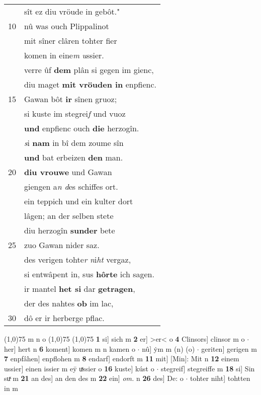 \documentclass[8pt,a4paper,notitlepage]{article}
\begin{document}
\begin{table}[ht]
\begin{minipage}[t]{0.5\linewidth}
\begin{tabular}{rl}
 & sît ez diu vröude in gebôt."\\ 
10 & nû was ouch Plippalinot\\ 
 & mit sîner clâren tohter fier\\ 
 & komen in eine\textit{m} \textit{u}ssier.\\ 
 & verre ûf \textbf{dem} plân si gegen im gienc,\\ 
 & diu maget \textbf{mit vröuden in} enpfienc.\\ 
15 & Gawan bôt \textbf{ir} sînen gruoz;\\ 
 & si kuste im stegrei\textit{f} und vuoz\\ 
 & \textbf{und} enpfienc ouch \textbf{die} herzogîn.\\ 
 & \textit{s}i \textbf{nam} in bî dem zoume sîn\\ 
 & \textbf{und} bat erbeizen \textbf{den} man.\\ 
20 & \textbf{diu vrouwe} und Gawan\\ 
 & giengen a\textit{n d}es schiffes ort.\\ 
 & ein teppich und ein kulter dort\\ 
 & lâgen; an der selben stete\\ 
 & diu herzogîn \textbf{sunder} bete\\ 
25 & zuo Gawan nider saz.\\ 
 & des verigen tohte\textit{r} \textit{n}i\textit{ht} vergaz,\\ 
 & si entwâpent in, sus \textbf{hôrte} ich sagen.\\ 
 & ir mantel \textbf{het si} dar \textbf{getragen},\\ 
 & der des nahtes \textbf{ob} im lac,\\ 
30 & dô er ir herberge pflac.\\ 
\end{tabular}
\scriptsize
\line(1,0){75} \newline
m n o \newline
\line(1,0){75} \newline
\newline
\line(1,0){75} \newline
\textbf{1} si] sich m \textbf{2} er] >er< o \textbf{4} Clinsors] clinsor m o  $\cdot$ her] hert n \textbf{6} koment] komen m n kamen o  $\cdot$ nû] ẏm m (n) (o)  $\cdot$ geriten] gerigen m \textbf{7} enpfâhen] enpflohen m \textbf{8} endarf] endorft m \textbf{11} mit] [Min]: Mit n \textbf{12} einem ussier] einen issier m eȳ uͯssier o \textbf{16} kuste] kúst o  $\cdot$ stegreif] stegreiffe m \textbf{18} si] Sin suͯ m \textbf{21} an des] an den des m \textbf{22} ein] \textit{om.} n \textbf{26} des] De: o  $\cdot$ tohter niht] tohtten in m \newline
\end{minipage}
\end{table}
\end{document}
